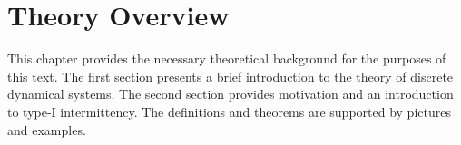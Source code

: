 \chapter{Theory Overview}

This chapter provides the necessary theoretical background for the purposes of this text.
The first section presents a brief introduction to the theory of discrete dynamical systems.
The second section provides motivation and an introduction to type-I intermittency.
The definitions and theorems are supported by pictures and examples.




\endinput